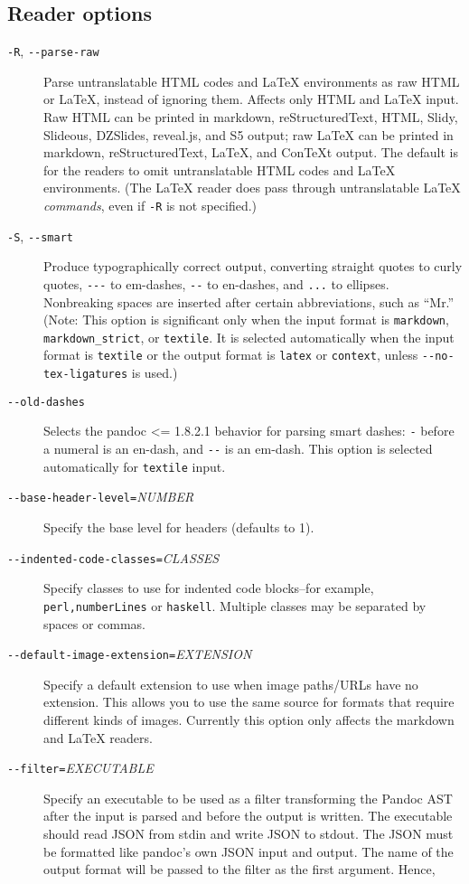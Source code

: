 \documentclass[]{article}
\begin{document}
\subsection{Reader options}\label{reader-options}

\begin{description}
\item[\texttt{-R}, \texttt{-{}-parse-raw}]
Parse untranslatable HTML codes and LaTeX environments as raw HTML or
LaTeX, instead of ignoring them. Affects only HTML and LaTeX input. Raw
HTML can be printed in markdown, reStructuredText, HTML, Slidy,
Slideous, DZSlides, reveal.js, and S5 output; raw LaTeX can be printed
in markdown, reStructuredText, LaTeX, and ConTeXt output. The default is
for the readers to omit untranslatable HTML codes and LaTeX
environments. (The LaTeX reader does pass through untranslatable LaTeX
\emph{commands}, even if \texttt{-R} is not specified.)
\item[\texttt{-S}, \texttt{-{}-smart}]
Produce typographically correct output, converting straight quotes to
curly quotes, \texttt{-{}-{}-} to em-dashes, \texttt{-{}-} to en-dashes,
and \texttt{...} to ellipses. Nonbreaking spaces are inserted after
certain abbreviations, such as ``Mr.'' (Note: This option is significant
only when the input format is \texttt{markdown},
\texttt{markdown\_strict}, or \texttt{textile}. It is selected
automatically when the input format is \texttt{textile} or the output
format is \texttt{latex} or \texttt{context}, unless
\texttt{-{}-no-tex-ligatures} is used.)
\item[\texttt{-{}-old-dashes}]
Selects the pandoc \textless{}= 1.8.2.1 behavior for parsing smart
dashes: \texttt{-} before a numeral is an en-dash, and \texttt{-{}-} is
an em-dash. This option is selected automatically for \texttt{textile}
input.
\item[\texttt{-{}-base-header-level=}\emph{NUMBER}]
Specify the base level for headers (defaults to 1).
\item[\texttt{-{}-indented-code-classes=}\emph{CLASSES}]
Specify classes to use for indented code blocks--for example,
\texttt{perl,numberLines} or \texttt{haskell}. Multiple classes may be
separated by spaces or commas.
\item[\texttt{-{}-default-image-extension=}\emph{EXTENSION}]
Specify a default extension to use when image paths/URLs have no
extension. This allows you to use the same source for formats that
require different kinds of images. Currently this option only affects
the markdown and LaTeX readers.
\item[\texttt{-{}-filter=}\emph{EXECUTABLE}]
Specify an executable to be used as a filter transforming the Pandoc AST
after the input is parsed and before the output is written. The
executable should read JSON from stdin and write JSON to stdout. The
JSON must be formatted like pandoc's own JSON input and output. The name
of the output format will be passed to the filter as the first argument.
Hence,


\end{description}
\end{document}
